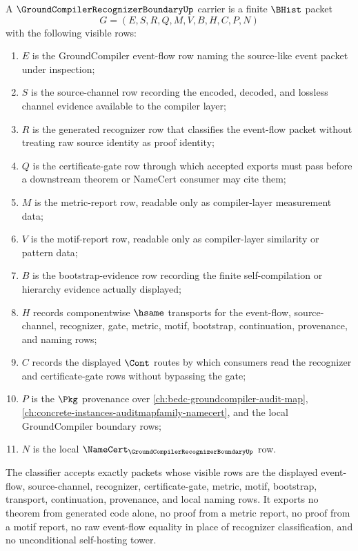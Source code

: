 \begin{definition}
\label{def:groundcompiler-recognizer-boundary-carrier}
A $\GroundCompilerRecognizerBoundaryUp$ carrier is a finite $\BHist$ packet
$$
G=(E,S,R,Q,M,V,B,H,C,P,N)
$$
with the following visible rows:
\begin{enumerate}
\item $E$ is the GroundCompiler event-flow row naming the source-like event packet under inspection;
\item $S$ is the source-channel row recording the encoded, decoded, and lossless channel evidence available to the compiler layer;
\item $R$ is the generated recognizer row that classifies the event-flow packet without treating raw source identity as proof identity;
\item $Q$ is the certificate-gate row through which accepted exports must pass before a downstream theorem or NameCert consumer may cite them;
\item $M$ is the metric-report row, readable only as compiler-layer measurement data;
\item $V$ is the motif-report row, readable only as compiler-layer similarity or pattern data;
\item $B$ is the bootstrap-evidence row recording the finite self-compilation or hierarchy evidence actually displayed;
\item $H$ records componentwise $\hsame$ transports for the event-flow, source-channel, recognizer, gate, metric, motif, bootstrap, continuation, provenance, and naming rows;
\item $C$ records the displayed $\Cont$ routes by which consumers read the recognizer and certificate-gate rows without bypassing the gate;
\item $P$ is the $\Pkg$ provenance over \autoref{ch:bedc-groundcompiler-audit-map}, \autoref{ch:concrete-instances-auditmapfamily-namecert}, and the local GroundCompiler boundary rows;
\item $N$ is the local $\NameCert_{\GroundCompilerRecognizerBoundaryUp}$ row.
\end{enumerate}
The classifier accepts exactly packets whose visible rows are the displayed event-flow, source-channel, recognizer, certificate-gate, metric, motif, bootstrap, transport, continuation, provenance, and local naming rows. It exports no theorem from generated code alone, no proof from a metric report, no proof from a motif report, no raw event-flow equality in place of recognizer classification, and no unconditional self-hosting tower.
\end{definition}

